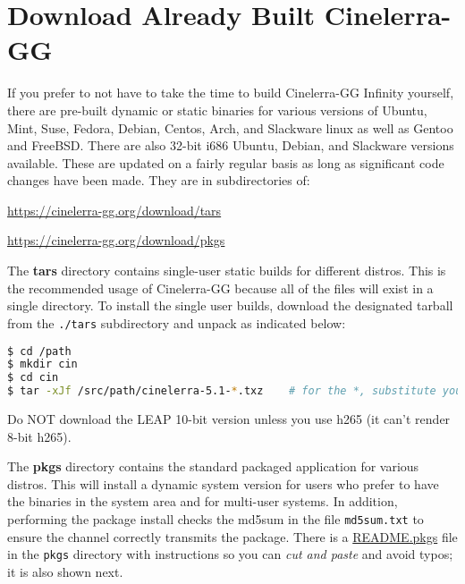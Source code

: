 \section{Download Already Built Cinelerra-GG}%
\label{sec:download_already_built_cinelerra_gg}

If you prefer to not have to take the time to build Cinelerra-GG Infinity yourself, there are pre-built dynamic or static binaries for various versions of Ubuntu, Mint, Suse, Fedora, Debian, Centos, Arch, and Slackware linux as well as Gentoo and FreeBSD.  
There are also 32-bit i686 Ubuntu, Debian, and Slackware versions available.  
These are updated on a fairly regular basis as long as significant code changes have been made.  
They are in subdirectories of:

{\small \url{https://cinelerra-gg.org/download/tars}
	
	\url{https://cinelerra-gg.org/download/pkgs}}

The \textbf{tars} directory contains single-user static builds for different distros.  
This is the recommended usage of Cinelerra-GG because all of the files will exist in a single directory.  
To install the single user builds, download the designated tarball from the \texttt{./tars} subdirectory and unpack as indicated below:

\begin{lstlisting}[language=bash,numbers=none]
$ cd /path
$ mkdir cin
$ cd cin
$ tar -xJf /src/path/cinelerra-5.1-*.txz    # for the *, substitute your distro tarball name
\end{lstlisting}

Do NOT download the LEAP 10-bit version unless you use h265 (it can't render 8-bit h265).

The \textbf{pkgs} directory contains the standard packaged application for various distros.  
This will install a dynamic system version for users who prefer to have the binaries in the system area and for multi-user systems.  
In addition, performing the package install checks the md5sum in the file \texttt{md5sum.txt} to ensure the channel correctly transmits the package.  
There is a {\small \href{https://cinelerra-gg.org/download/pkgs/README.pkgs}{README.pkgs}} file in the \texttt{pkgs} directory with instructions so you can \textit{ cut and paste} and avoid typos; it is also shown next.

